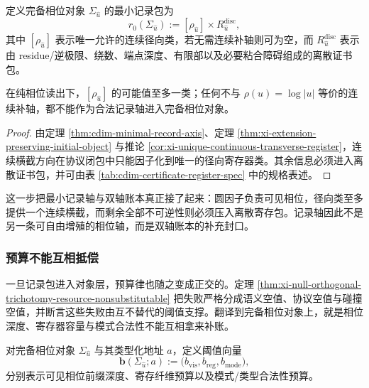 \begin{definition}[最小记录包]\label{def:typed-address-biaxial-completion-minimal-record-package}
定义完备相位对象 \(\Sigma_{\hat u}\) 的最小记录包为
\[
r_0(\Sigma_{\hat u})
:=
[\rho_{\hat u}]
\times
R^{\mathrm{disc}}_{\hat u},
\]
其中 \([\rho_{\hat u}]\) 表示唯一允许的连续径向类，若无需连续补轴则可为空，而 \(R^{\mathrm{disc}}_{\hat u}\) 表示由 residue/逆极限、绕数、端点深度、有限部以及必要粘合障碍组成的离散证书包。
\end{definition}

\begin{proposition}[连续横截的唯一性]\label{prop:typed-address-biaxial-completion-unique-continuous-transversal}
在纯相位读出下，\([\rho_{\hat u}]\) 的可能值至多一类；任何不与 \(\rho(u)=\log|u|\) 等价的连续补轴，都不能作为合法记录轴进入完备相位对象。
\end{proposition}
\begin{proof}
由定理 \ref{thm:cdim-minimal-record-axis}、定理 \ref{thm:xi-extension-preserving-initial-object} 与推论 \ref{cor:xi-unique-continuous-transverse-register}，连续横截方向在协议闭包中只能因子化到唯一的径向寄存器类。其余信息必须进入离散证书包，并可由表 \ref{tab:cdim-certificate-register-spec} 中的规格表述。
\end{proof}

这一步把最小记录轴与双轴账本真正接了起来：圆因子负责可见相位，径向类至多提供一个连续横截，而剩余全部不可逆性则必须压入离散寄存包。记录轴因此不是另一条可自由增殖的相位轴，而是双轴账本的补充封口。

\subsubsection{预算不能互相抵偿}\label{subsubsec:typed-address-biaxial-completion-budget-nonsubstitutable}
一旦记录包进入对象层，预算律也随之变成正交的。定理 \ref{thm:xi-null-orthogonal-trichotomy-resource-nonsubstitutable} 把失败严格分成语义空值、协议空值与碰撞空值，并断言这些失败由互不替代的阈值支撑。翻译到完备相位对象上，就是相位深度、寄存器容量与模式合法性不能互相拿来补账。

\begin{definition}[正交阈值向量]\label{def:typed-address-biaxial-completion-threshold-vector}
对完备相位对象 \(\Sigma_{\hat u}\) 与其类型化地址 \(a\)，定义阈值向量
\[
\mathbf b(\Sigma_{\hat u};a)
:=
\bigl(
b_{\mathrm{vis}},
b_{\mathrm{reg}},
b_{\mathrm{mode}}
\bigr),
\]
分别表示可见相位前缀深度、寄存纤维预算以及模式/类型合法性预算。
\end{definition}

